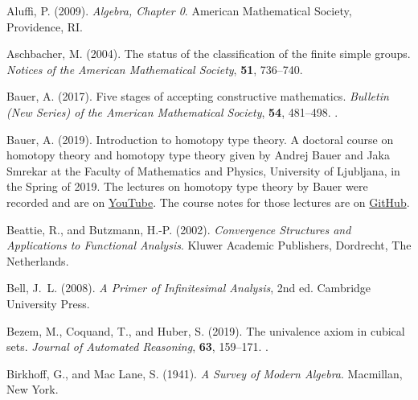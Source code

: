 \documentclass[11pt]{article}
\begin{document}
\begin{thebibliography}{}

Aluffi, P. (2009).
\newblock \emph{Algebra, Chapter 0}.
\newblock American Mathematical Society, Providence, RI.

Aschbacher, M. (2004).
\newblock The status of the classification of the finite simple groups.
\newblock \emph{Notices of the American Mathematical Society}, \textbf{51},
    736--740.

Bauer, A. (2017).
\newblock Five stages of accepting constructive mathematics.
\newblock \emph{Bulletin (New Series) of the American Mathematical Society},
    \textbf{54}, 481--498.
\newblock {}.

Bauer, A. (2019).
\newblock Introduction to homotopy type theory.
\newblock A doctoral course on homotopy theory and homotopy type theory
    given by Andrej Bauer and Jaka Smrekar at the Faculty of Mathematics
    and Physics, University of Ljubljana, in the Spring of 2019.
\newblock The lectures on homotopy type theory by Bauer were recorded
    and are on \href{https://www.youtube.com/playlist?list=PL-47DDuiZOMCRDiXDZ1fI0TFLQgQqOdDa}{YouTube}.
\newblock The course notes for those lectures are on
    \href{https://github.com/andrejbauer/homotopy-type-theory-course}{GitHub}.

Beattie, R., and Butzmann, H.-P. (2002).
\newblock \emph{Convergence Structures and Applications to Functional Analysis}.
\newblock Kluwer Academic Publishers, Dordrecht, The Netherlands.

Bell, J.~L. (2008).
\newblock \emph{A Primer of Infinitesimal Analysis}, 2nd ed.
\newblock Cambridge University Press.

Bezem, M., Coquand, T., and Huber, S. (2019).
\newblock The univalence axiom in cubical sets.
\newblock \emph{Journal of Automated Reasoning}, \textbf{63}, 159--171.
\newblock {}.


Birkhoff, G., and Mac Lane, S. (1941).
\newblock \emph{A Survey of Modern Algebra}.
\newblock Macmillan, New York.


\end{thebibliography}
\end{document}

